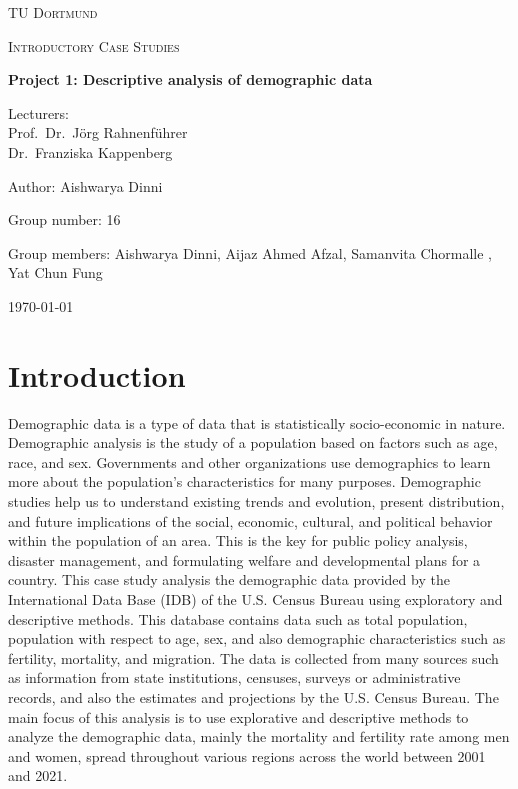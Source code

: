\documentclass[12 pt]{scrartcl}
\begin{document}
	\begin{titlepage}
		\centering
		{\scshape\LARGE TU Dortmund \par}
		\vspace{1cm}
		{\scshape\Large Introductory Case Studies \par}
		\vspace{2cm}
		{\huge\bfseries Project {1}: {Descriptive analysis of demographic data}\par}
		\vspace{2cm}
		{\Large Lecturers:\\
			Prof.\ Dr.\ Jörg Rahnenführer\\
			Dr.\ Franziska Kappenberg\ \par}
		\vspace{1cm}
		{\Large Author: {Aishwarya Dinni} \par}
		\vspace{0.5 cm}
		{\Large Group number: {16}\par}
		\vspace{0.5 cm}
		{\Large Group members: {Aishwarya Dinni, Aijaz Ahmed Afzal, Samanvita Chormalle , Yat Chun Fung}}
		\vfill
		{\large \today\par}
	\end{titlepage}
	
	
	\tableofcontents
	
	\cleardoublepage
	\setcounter{page}{1}
	\section{Introduction}
	
	Demographic data is a type of data that is statistically socio-economic in nature. Demographic analysis is the study of a population based on factors such as age, race, and sex. Governments and other organizations use demographics to learn more about the population's characteristics for many purposes.
	Demographic studies help us to understand existing trends and evolution, present distribution, and future implications of the social, economic, cultural, and political behavior within	the population of an area. This is the key for public policy analysis, disaster management, and formulating welfare and developmental plans for a country.
	This case study analysis the demographic data provided by the International Data Base (IDB) of the U.S. Census Bureau using exploratory and descriptive methods.
	This database contains data such as total population, population with respect to age, sex, and also demographic characteristics such as fertility, mortality, and migration. The data is collected from many sources such as information from state institutions, censuses, surveys or administrative records, and also the estimates and projections by the U.S. Census Bureau.
	The main focus of this analysis is to use explorative and descriptive methods to analyze the demographic data, mainly the mortality and fertility rate among men and women, spread throughout various regions across the world between 2001 and 2021.
	
\end{document}

